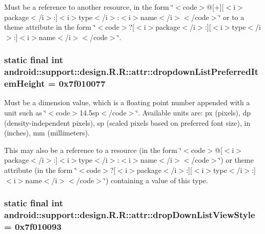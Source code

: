 Must be a reference to another resource, in the form \char`\"{}$<$code$>$@\mbox{[}+\mbox{]}\mbox{[}$<$i$>$package$<$/i$>$:\mbox{]}$<$i$>$type$<$/i$>$:$<$i$>$name$<$/i$>$$<$/code$>$\char`\"{} or to a theme attribute in the form \char`\"{}$<$code$>$?\mbox{[}$<$i$>$package$<$/i$>$:\mbox{]}\mbox{[}$<$i$>$type$<$/i$>$:\mbox{]}$<$i$>$name$<$/i$>$$<$/code$>$\char`\"{}. \hypertarget{classandroid_1_1support_1_1design_1_1_r_1_1attr_37c18c54015e819cfe9420661b171f40}{
\subsubsection[{dropdownListPreferredItemHeight}]{\setlength{\rightskip}{0pt plus 5cm}static final int android::support::design.R.R::attr::dropdownListPreferredItemHeight = 0x7f010077}}
\label{classandroid_1_1support_1_1design_1_1_r_1_1attr_37c18c54015e819cfe9420661b171f40}


Must be a dimension value, which is a floating point number appended with a unit such as \char`\"{}$<$code$>$14.5sp$<$/code$>$\char`\"{}. Available units are: px (pixels), dp (density-independent pixels), sp (scaled pixels based on preferred font size), in (inches), mm (millimeters). 

This may also be a reference to a resource (in the form \char`\"{}$<$code$>$@\mbox{[}$<$i$>$package$<$/i$>$:\mbox{]}$<$i$>$type$<$/i$>$:$<$i$>$name$<$/i$>$$<$/code$>$\char`\"{}) or theme attribute (in the form \char`\"{}$<$code$>$?\mbox{[}$<$i$>$package$<$/i$>$:\mbox{]}\mbox{[}$<$i$>$type$<$/i$>$:\mbox{]}$<$i$>$name$<$/i$>$$<$/code$>$\char`\"{}) containing a value of this type. \hypertarget{classandroid_1_1support_1_1design_1_1_r_1_1attr_c3423ff715bf4ad801c38fc66a3e6261}{
\subsubsection[{dropDownListViewStyle}]{\setlength{\rightskip}{0pt plus 5cm}static final int android::support::design.R.R::attr::dropDownListViewStyle = 0x7f010093}}
\label{classandroid_1_1support_1_1design_1_1_r_1_1attr_c3423ff715bf4ad801c38fc66a3e6261}


